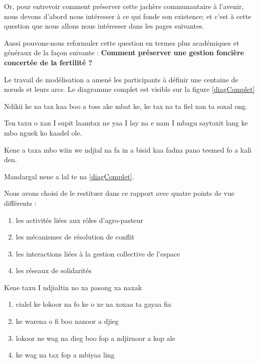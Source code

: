 \begin{paracol}{2}
  Or, pour entrevoir comment préserver cette jachère communautaire à l'avenir, nous devons d'abord nous intéresser à ce qui fonde son existence; et c'est à cette question que nous allons nous intéresser dans les pages suivantes.

  Aussi pouvons-nous reformuler cette question en termes plus académiques et généraux de la façon suivante : \textbf{Comment préserver une gestion foncière concertée de la fertilité ?}

  Le travail de modélisation a amené les participants à définir une centaine de nœuds et leurs arcs. Le diagramme complet est visible sur la figure \ref{diagComplet}

  \switchcolumn %

  Ndikii ke na tax kaa boo a toss ake mbat ke, ke tax na ta fiel xan ta soxal ong.

  Ten taxu o xan I supit laamtax ne yaa I lay na e nam I mbagu saytoxit lang ke mbo nguek ko kaadel ole.

  Kene a taxa mbo wiin we ndjial na fa in a bisid kaa fadna pano teemed fo a kali den.

  Mandargal nene a lal te na \ref{diagComplet}.



  \switchcolumn %
  Nous avons choisi de le restituer dans ce rapport avec quatre points de vue différents :
  \begin{enumerate}
    \item les activités liées aux rôles d'agro-pasteur
    \item les mécanismes de résolution de conflit
    \item les interactions liées à la gestion collective de l'espace
    \item les réseaux de solidarités
  \end{enumerate}

  \switchcolumn %

  Kene taxu I ndjialtin no xa pasong xa naxak
  \begin{enumerate}
    \item cialel ke lokoor na fo ke o xe na xoxaa ta gayaa fia
    \item ke warena o fi boo nanoor a djieg
    \item lokoor ne wag na dieg boo fop a ndjirnoor a kop ale
    \item ke wag na tax fop a mbiyaa ling
  \end{enumerate}

\end{paracol}



